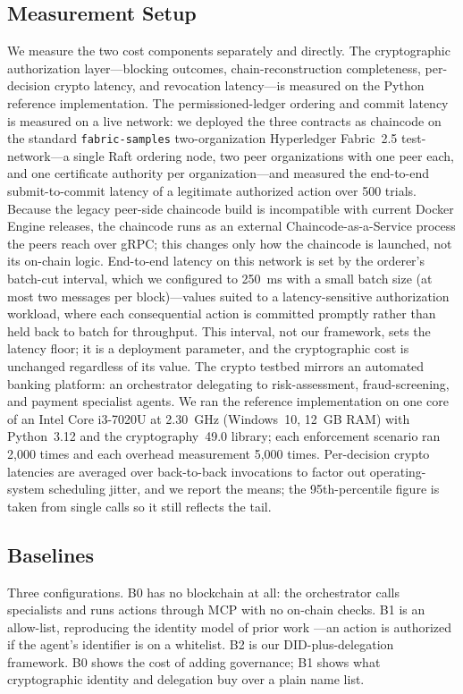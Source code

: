 \documentclass[conference]{IEEEtran}
\begin{document}
\subsection{Measurement Setup}
We measure the two cost components separately and directly. The cryptographic authorization layer---blocking outcomes, chain-reconstruction completeness, per-decision crypto latency, and revocation latency---is measured on the Python reference implementation. The permissioned-ledger ordering and commit latency is measured on a live network: we deployed the three contracts as chaincode on the standard \texttt{fabric-samples} two-organization Hyperledger Fabric~2.5 test-network---a single Raft ordering node, two peer organizations with one peer each, and one certificate authority per organization---and measured the end-to-end submit-to-commit latency of a legitimate authorized action over 500 trials. Because the legacy peer-side chaincode build is incompatible with current Docker Engine releases, the chaincode runs as an external Chaincode-as-a-Service process the peers reach over gRPC; this changes only how the chaincode is launched, not its on-chain logic. End-to-end latency on this network is set by the orderer's batch-cut interval, which we configured to 250~ms with a small batch size (at most two messages per block)---values suited to a latency-sensitive authorization workload, where each consequential action is committed promptly rather than held back to batch for throughput. This interval, not our framework, sets the latency floor; it is a deployment parameter, and the cryptographic cost is unchanged regardless of its value. The crypto testbed mirrors an automated banking platform: an orchestrator delegating to risk-assessment, fraud-screening, and payment specialist agents. We ran the reference implementation on one core of an Intel Core i3-7020U at 2.30~GHz (Windows~10, 12~GB RAM) with Python~3.12 and the cryptography~49.0 library; each enforcement scenario ran 2{,}000 times and each overhead measurement 5{,}000 times. Per-decision crypto latencies are averaged over back-to-back invocations to factor out operating-system scheduling jitter, and we report the means; the 95th-percentile figure is taken from single calls so it still reflects the tail.

\subsection{Baselines}
Three configurations. B0 has no blockchain at all: the orchestrator calls specialists and runs actions through MCP with no on-chain checks. B1 is an allow-list, reproducing the identity model of prior work \cite{jan2025}---an action is authorized if the agent's identifier is on a whitelist. B2 is our DID-plus-delegation framework. B0 shows the cost of adding governance; B1 shows what cryptographic identity and delegation buy over a plain name list.
\end{document}
